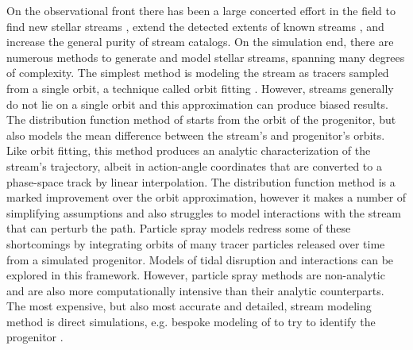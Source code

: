 \documentclass[fleqn,usenatbib]{mnras}
\begin{document}
  On the observational front there has been a large concerted effort in the
  field to find new stellar streams \citep[for an extensive list of known
  Galactic streams see][]{Mateu2022}, extend the detected extents of known
  streams \citep[e.g. for  alone:][]{Rockosi2002, Ibata2017,
  Grillmair2006, Carlberg2012, Starkman2019}, and increase the general purity of
  stream catalogs. On the simulation end, there are numerous methods to generate
  and model stellar streams, spanning many degrees of complexity. The simplest
  method is modeling the stream as tracers sampled from a single orbit, a
  technique called orbit fitting \citep[e.g.][]{Johnston1999, Malhan2019}.
  However, streams generally do not lie on a single orbit
  \citep{SandersBinney2013I} and this approximation can produce biased results.
  The distribution function method of \citet{Bovy2014} starts from the orbit of
  the progenitor, but also models the mean difference between the stream's and
  progenitor's orbits. Like orbit fitting, this method produces an analytic
  characterization of the stream's trajectory, albeit in action-angle
  coordinates that are converted to a phase-space track by linear interpolation.
  The distribution function method is a marked improvement over the orbit
  approximation, however it makes a number of simplifying assumptions and also
  struggles to model interactions with the stream that can perturb the path.
  Particle spray models \citep[e.g.][]{Fardal2015,Bonaca2014} redress some of
  these shortcomings by integrating orbits of many tracer particles released
  over time from a simulated progenitor. Models of tidal disruption and
  interactions can be explored in this framework. However, particle spray
  methods are non-analytic and are also more computationally intensive than
  their analytic counterparts. The most expensive, but also most accurate and
  detailed, stream modeling method is direct \nbody{} simulations, e.g. bespoke
  modeling of  to try to identify the progenitor \citep{Webb2019}.
  
\end{document}
